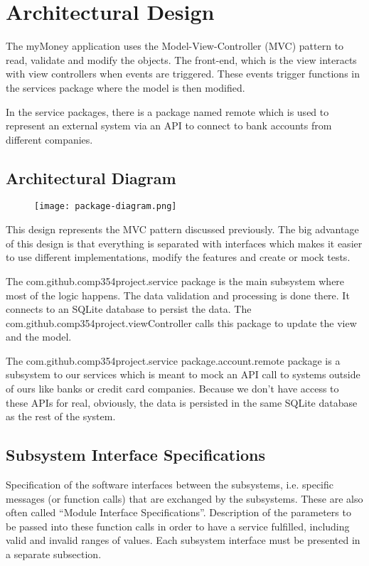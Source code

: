 \documentclass[12pt]{article}
\begin{document}

\section{Architectural Design} \label{sec:arch}

The myMoney application uses the Model-View-Controller (MVC) pattern to read, validate and modify the objects. The front-end, which is the view interacts with view controllers when events are triggered. These events trigger functions in the services package where the model is then modified.

In the service packages, there is a package named remote which is used to represent an external system via an API to connect to bank accounts from different companies.

\subsection{Architectural Diagram}

\begin{figure}[H]
\texttt{[image: package-diagram.png]}
\end{figure}

This design represents the MVC pattern discussed previously. The big advantage of this design is that everything is separated with interfaces which makes it easier to use different implementations, modify the features and create or mock tests.

The com.github.comp354project.service package is the main subsystem where most of the logic happens. The data validation and processing is done there. It connects to an SQLite database to persist the data. The com.github.comp354project.viewController calls this package to update the view and the model.

The com.github.comp354project.service package.account.remote package is a subsystem to our services which is meant to mock an API call to systems outside of ours like banks or credit card companies. Because we don't have access to these APIs for real, obviously, the data is persisted in the same SQLite database as the rest of the system.

\subsection{Subsystem Interface Specifications}

Specification of the software interfaces between the subsystems,
i.e. specific messages (or function calls) that are exchanged by the subsystems.
These are also often called ``Module Interface Specifications''.
Description of the parameters to be passed into these function calls in order to have a service fulfilled,
including valid and invalid ranges of values.
Each subsystem interface must be presented in a separate subsection.
\end{document}
